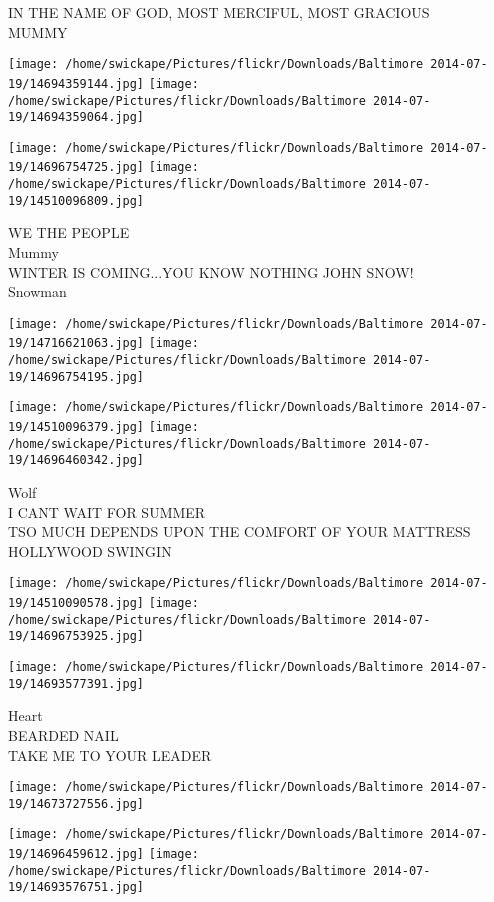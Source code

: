 \documentclass[10pt,letterpaper]{article}
\begin{document}
IN THE NAME OF GOD, MOST MERCIFUL, MOST GRACIOUS\\
MUMMY
\pagebreak

\texttt{[image: /home/swickape/Pictures/flickr/Downloads/Baltimore 2014-07-19/14694359144.jpg]}
\texttt{[image: /home/swickape/Pictures/flickr/Downloads/Baltimore 2014-07-19/14694359064.jpg]}

\texttt{[image: /home/swickape/Pictures/flickr/Downloads/Baltimore 2014-07-19/14696754725.jpg]}
\texttt{[image: /home/swickape/Pictures/flickr/Downloads/Baltimore 2014-07-19/14510096809.jpg]}

WE THE PEOPLE\\
Mummy\\
WINTER IS COMING...YOU KNOW NOTHING JOHN SNOW!\\
Snowman
\pagebreak

\texttt{[image: /home/swickape/Pictures/flickr/Downloads/Baltimore 2014-07-19/14716621063.jpg]}
\texttt{[image: /home/swickape/Pictures/flickr/Downloads/Baltimore 2014-07-19/14696754195.jpg]}

\texttt{[image: /home/swickape/Pictures/flickr/Downloads/Baltimore 2014-07-19/14510096379.jpg]}
\texttt{[image: /home/swickape/Pictures/flickr/Downloads/Baltimore 2014-07-19/14696460342.jpg]}

Wolf\\
I CANT WAIT FOR SUMMER\\
TSO MUCH DEPENDS UPON THE COMFORT OF YOUR MATTRESS\\
HOLLYWOOD SWINGIN
\pagebreak

\texttt{[image: /home/swickape/Pictures/flickr/Downloads/Baltimore 2014-07-19/14510090578.jpg]}
\texttt{[image: /home/swickape/Pictures/flickr/Downloads/Baltimore 2014-07-19/14696753925.jpg]}

\texttt{[image: /home/swickape/Pictures/flickr/Downloads/Baltimore 2014-07-19/14693577391.jpg]}

Heart\\
BEARDED NAIL\\
TAKE ME TO YOUR LEADER
\pagebreak

\texttt{[image: /home/swickape/Pictures/flickr/Downloads/Baltimore 2014-07-19/14673727556.jpg]}

\vspace{0.25in}
\texttt{[image: /home/swickape/Pictures/flickr/Downloads/Baltimore 2014-07-19/14696459612.jpg]}
\texttt{[image: /home/swickape/Pictures/flickr/Downloads/Baltimore 2014-07-19/14693576751.jpg]}
\end{document}
